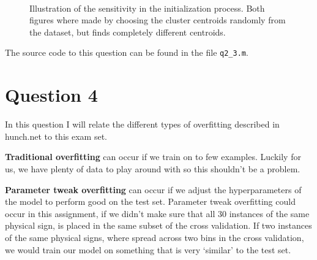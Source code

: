 \documentclass[10pt]{article}
\begin{document}
\begin{figure}[ht]
\centering
\mbox{
     \quad
}                    
\caption{Illustration of the sensitivity in the initialization process. Both figures where made by choosing the cluster centroids randomly from the dataset, but finds completely different centroids.}
\label{label}
\end{figure}

The source code to this question can be found in the file \texttt{q2\_3.m}.


\section*{Question 4} %
\label{sec:question_4}
In this question I will relate the different types of overfitting described in hunch.net\cite{hunch} to this exam set.

\textbf{Traditional overfitting} can occur if we train on to few examples. Luckily for us, we have plenty of data to play around with so this shouldn't be a problem.

\textbf{Parameter tweak overfitting} can occur if we adjust the hyperparameters of the model to perform good on the test set. Parameter tweak overfitting could occur in this assignment, if we didn't make sure that all 30 instances of the same physical sign, is placed in the same subset of the cross validation. If two instances of the same physical signs, where spread across two bins in the cross validation, we would train our model on something that is very `similar' to the test set.
\end{document}
